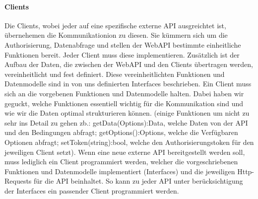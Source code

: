 \paragraph{Clients}
Die Clients, wobei jeder auf eine spezifische externe API ausgreichtet ist, übernehemen die Kommunikationion zu diesen. Sie kümmern sich um die Authorisierung, Datenabfrage und stellen der WebAPI bestimmte einheitliche Funktionen bereit. Jeder Client muss diese implementieren. Zusätzlich ist der Aufbau der Daten, die zwischen der WebAPI und den Clients übertragen werden, vereinheitlicht und fest definiert. Diese vereinheitlichten Funktionen und Datenmodelle sind in von uns definierten Interfaces beschrieben. Ein Client muss sich an die vorgebenen Funktionen und Datenmodelle halten. Dabei haben wir geguckt, welche Funktionen essentiell wichtig für die Kommunikation sind und wie wir die Daten optimal strukturieren können. (einige Funktionen um nicht zu sehr ins Detail zu gehen zb.: getData(Options):Data, welche Daten von der API und den Bedingungen abfragt; getOptions():Options, welche die Verfügbaren Optionen abfragt; setToken(string):bool, welche den Authorisierungstoken für den jeweiligen Client setzt). Wenn eine neue externe API bereitgestellt werden soll, muss lediglich ein Client programmiert werden, welcher die vorgeschriebenen Funktionen und Datenmodelle implementiert (Interfaces) und die jeweiligen Http-Requests für die API beinhaltet. So kann zu jeder API unter berücksichtigung der Interfaces ein passender Client programmiert werden.\\\


